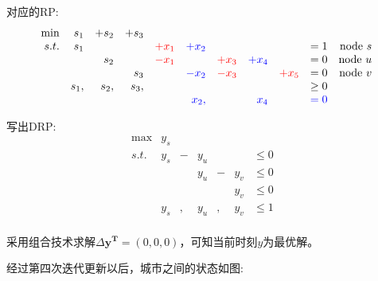 \documentclass[11pt]{article}
\begin{document}
\begin{CJK}{UTF8}{gbsn}
对应的RP:
\[
\begin{array}{rrrrrrrrrrrrrrrrrl}
 \min & s_1 &+s_2 & +s_3 &     &        &    &     &   & \\
 s.t. & s_1 &     &     & \textcolor{red}{+x_1}  & \textcolor{blue}{+x_2} &    &     &   & = 1    & \text{node }s  \\
     &      &s_2     &             &  \textcolor{red}{-x_1}  &     & \textcolor{red}{+x_3}  &  \textcolor{blue}{+x_4}     &  & =  0  & \text{node }u\\
     &      &          & s_3       &     & \textcolor{blue}{-x_2}    & \textcolor{red}{-x_3}  &      & \textcolor{red}{+x_5} & =  0 & \text{node }v \\
     & s_1, &s_2, &s_3,  &      &          &         &         &     & \geq 0 \\
     &         &       &         &    &    \textcolor{blue}{ x_2,} &      &   \textcolor{blue}{x_4} &  & \textcolor{blue}{= 0} \\ 	
\end{array} \nonumber
\]

写出DRP:
\[
\begin{array}{rrrrrrrrrl}
 \max & y_s   & &    \\
 s.t. & y_s &-& y_u  & &     &  \leq 0 &  \\
     &  & &   y_u   &-& y_v &  \leq 0 & \\
     &  & &       & & y_v &  \leq 0 & \\
      & y_s &,& y_u  &,& y_v &  \leq 1 &  \\
\end{array} \nonumber
\]

采用组合技术求解$\Delta \mathbf{y^T} = (0, 0, 0)$，可知当前时刻$y$为最优解。

经过第四次迭代更新以后，城市之间的状态如图:
\begin{figure}[H]
\end{figure}
\end{CJK}
\end{document}
